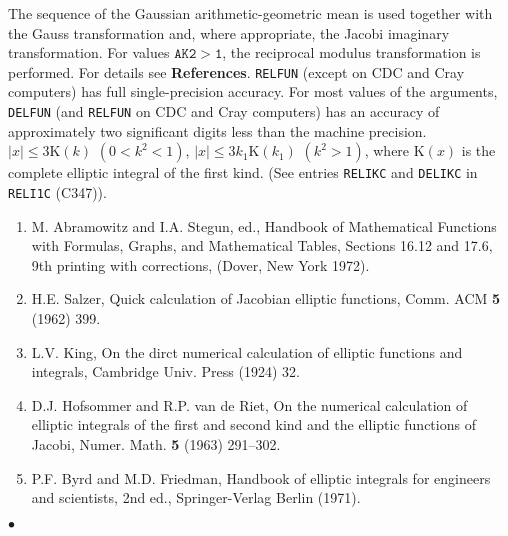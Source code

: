 \Method
The sequence of the Gaussian arithmetic-geometric mean is used together
with the Gauss transformation and, where appropriate, the Jacobi
imaginary transformation. For values $\mathtt{AK2 > 1}$, the reciprocal
modulus transformation is performed. For details see {\bf References}.
\Accuracy
{\tt RELFUN} (except on CDC and Cray computers)
has full single-precision accuracy.
For most values of the arguments, {\tt DELFUN}
(and {\tt RELFUN} on CDC and Cray computers) has an accuracy of
approximately two significant digits less than the machine precision.
\Restrict
$|x| \le 3 \mathrm{K}(k)$ $(0 < k^2 < 1)$,
$|x| \le 3 k_1\mathrm{K}(k_1)$ $(k^2 > 1)$,
where $\mathrm{K}(x)$ is the complete elliptic integral of the first
kind. (See entries {\tt RELIKC} and {\tt DELIKC} in {\tt RELI1C} (C347)).
\Refer
\begin{enumerate}
\item M. Abramowitz and I.A. Stegun, ed., Handbook
of Mathematical Functions with Formulas, Graphs, and Mathematical
Tables, Sections 16.12 and 17.6, 9th printing with corrections,
(Dover, New York 1972).
\item H.E. Salzer, Quick calculation of Jacobian elliptic functions,
Comm. ACM {\bf 5} (1962) 399.
\item L.V. King, On the dirct numerical calculation of elliptic
functions and integrals, Cambridge Univ. Press (1924) 32.
\item D.J. Hofsommer and R.P. van de Riet, On the numerical calculation
of elliptic integrals of the first and second kind and the elliptic
functions of Jacobi, Numer. Math. {\bf 5} (1963) 291--302.
\item P.F. Byrd and M.D. Friedman, Handbook of elliptic integrals for
engineers and scientists, 2nd ed., Springer-Verlag Berlin (1971).
\end{enumerate}
$\bullet$
